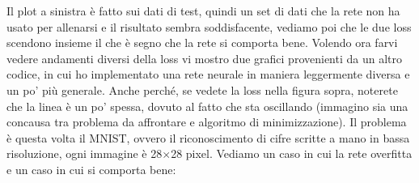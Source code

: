 \documentclass[10pt,a4paper]{article}
\begin{document}
Il plot a sinistra è fatto sui dati di test, quindi un set di dati che la rete non ha usato per allenarsi e il risultato sembra soddisfacente, vediamo poi che le due loss scendono insieme il che è segno che la rete si comporta bene. Volendo ora farvi vedere andamenti diversi della loss vi mostro due grafici provenienti da un altro codice, in cui ho implementato una rete neurale in maniera leggermente diversa e un po' più generale. Anche perché, se vedete la loss nella figura sopra, noterete che la linea è un po' spessa, dovuto al fatto che sta oscillando (immagino sia una concausa tra problema da affrontare e algoritmo di minimizzazione). Il problema è questa volta il MNIST, ovvero il riconoscimento di cifre scritte a mano in bassa risoluzione, ogni immagine è 28$\times$28 pixel. Vediamo un caso in cui la rete overfitta e un caso in cui si comporta bene:
\FloatBarrier
\end{document}

